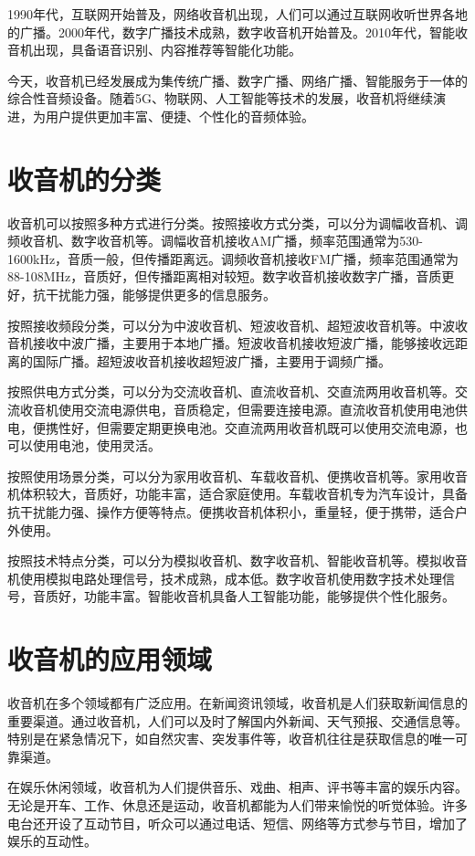 \documentclass[12pt,UTF8]{ctexbook}
\begin{document}
1990年代，互联网开始普及，网络收音机出现，人们可以通过互联网收听世界各地的广播。2000年代，数字广播技术成熟，数字收音机开始普及。2010年代，智能收音机出现，具备语音识别、内容推荐等智能化功能。

今天，收音机已经发展成为集传统广播、数字广播、网络广播、智能服务于一体的综合性音频设备。随着5G、物联网、人工智能等技术的发展，收音机将继续演进，为用户提供更加丰富、便捷、个性化的音频体验。

\section{收音机的分类}

收音机可以按照多种方式进行分类。按照接收方式分类，可以分为调幅收音机、调频收音机、数字收音机等。调幅收音机接收AM广播，频率范围通常为530-1600kHz，音质一般，但传播距离远。调频收音机接收FM广播，频率范围通常为88-108MHz，音质好，但传播距离相对较短。数字收音机接收数字广播，音质更好，抗干扰能力强，能够提供更多的信息服务。

按照接收频段分类，可以分为中波收音机、短波收音机、超短波收音机等。中波收音机接收中波广播，主要用于本地广播。短波收音机接收短波广播，能够接收远距离的国际广播。超短波收音机接收超短波广播，主要用于调频广播。

按照供电方式分类，可以分为交流收音机、直流收音机、交直流两用收音机等。交流收音机使用交流电源供电，音质稳定，但需要连接电源。直流收音机使用电池供电，便携性好，但需要定期更换电池。交直流两用收音机既可以使用交流电源，也可以使用电池，使用灵活。

按照使用场景分类，可以分为家用收音机、车载收音机、便携收音机等。家用收音机体积较大，音质好，功能丰富，适合家庭使用。车载收音机专为汽车设计，具备抗干扰能力强、操作方便等特点。便携收音机体积小，重量轻，便于携带，适合户外使用。

按照技术特点分类，可以分为模拟收音机、数字收音机、智能收音机等。模拟收音机使用模拟电路处理信号，技术成熟，成本低。数字收音机使用数字技术处理信号，音质好，功能丰富。智能收音机具备人工智能功能，能够提供个性化服务。

\section{收音机的应用领域}

收音机在多个领域都有广泛应用。在新闻资讯领域，收音机是人们获取新闻信息的重要渠道。通过收音机，人们可以及时了解国内外新闻、天气预报、交通信息等。特别是在紧急情况下，如自然灾害、突发事件等，收音机往往是获取信息的唯一可靠渠道。

在娱乐休闲领域，收音机为人们提供音乐、戏曲、相声、评书等丰富的娱乐内容。无论是开车、工作、休息还是运动，收音机都能为人们带来愉悦的听觉体验。许多电台还开设了互动节目，听众可以通过电话、短信、网络等方式参与节目，增加了娱乐的互动性。
\end{document}
